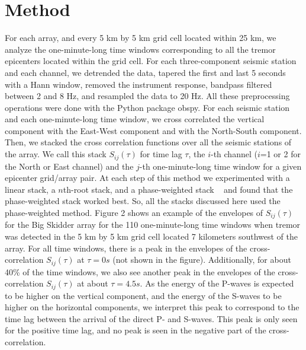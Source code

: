 \documentclass[draft]{agujournal2019}
\begin{document}
\section{Method}

For each array, and every 5 km by 5 km grid cell located within 25 km, we analyze the one-minute-long time windows corresponding to all the tremor epicenters located within the grid cell. For each three-component seismic station and each channel, we detrended the data, tapered the first and last 5 seconds with a Hann window, removed the instrument response, bandpass filtered between 2 and 8 Hz, and resampled the data to 20 Hz. All these preprocessing operations were done with the Python package obspy. For each seismic station and each one-minute-long time window, we cross correlated the vertical component with the East-West component and with the North-South component. Then, we stacked the cross correlation functions over all the seismic stations of the array. We call this stack $S_{i j} (\tau)$ for time lag $\tau$, the $i$-th channel ($i$=1 or 2 for the North or East channel) and the $j$-th one-minute-long time window for a given epicenter grid/array pair. At each step of this method we experimented with a linear stack, a $n$th-root stack, and a phase-weighted stack ~\cite{SCH_1997} and found that the phase-weighted stack worked best. So, all the stacks discussed here used the phase-weighted method.  Figure 2 shows an example of the envelopes of $S_{i j} (\tau)$ for the Big Skidder array for the 110 one-minute-long time windows when tremor was detected in the 5 km by 5 km grid cell located 7 kilometers southwest of the array. For all time windows, there is a peak in the envelopes of the cross-correlation $S_{i j} (\tau)$ at $\tau = 0 s$ (not shown in the figure). Additionally, for about 40\% of the time windows, we also see another peak in the envelopes of the cross-correlation $S_{i j} (\tau)$ at about $\tau = 4.5 s$. As the energy of the P-waves is expected to be higher on the vertical component, and the energy of the S-waves to be higher on the horizontal components, we interpret this peak to correspond to the time lag between the arrival of the direct P- and S-waves. This peak is only seen for the positive time lag, and no peak is seen in the negative part of the cross-correlation. \\
\end{document}
